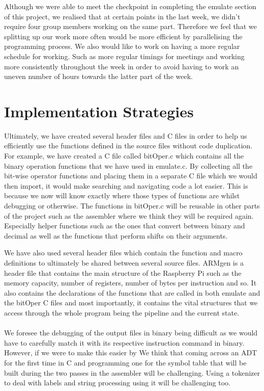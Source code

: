 \documentclass[11pt]{article}
\begin{document}
Although we were able to meet the checkpoint in completing the emulate section of this project, we realised that at certain points in the last week, we didn't require four group members working on the same part. Therefore we feel that we splitting up our work more often would be more efficient by parallelising the programming process. We also would like to work on having a more regular schedule for working. Such as more regular timings for meetings and working more consistently throughout the week in order to avoid having to work an uneven number of hours towards the latter part of the week.

\section{Implementation Strategies}

Ultimately, we have created several header files and C files in order to help us efficiently use the functions defined in the source files without code duplication. For example, we have created a C file called bitOper.c which contains all the binary operation functions that we have used in emulate.c. By collecting all the bit-wise operator functions and placing them in a separate C file which we would then import, it would make searching and navigating code a lot easier. This is because we now will know exactly where those types of functions are whilst debugging or otherwise. The functions in bitOper.c will be reusable in other parts of the project such as the assembler where we think they will be required again. Especially helper functions such as the ones that convert between binary and decimal as well as the functions that perform shifts on their arguments.

We have also used several header files which contain the function and macro definitions to ultimately be shared between several source files. ARMgen is a header file that contains the main structure of the Raspberry Pi such as the memory capacity, number of registers, number of bytes per instruction and so. It also contains the declarations of the functions that are called in both emulate and the bitOper C files and most importantly, it contains the vital structures that we access through the whole program being the pipeline and the current state.

\paragraph{}
We foresee the debugging of the output files in binary being difficult as we would have to carefully match it with its respective instruction command in binary. However, if we were to make this easier by We think that coming across an ADT for the first time in C and programming one for the symbol table that will be built during the two passes in the assembler will be challenging. Using a tokenizer to deal with labels and string processing using it will be challenging too. 
\end{document}
